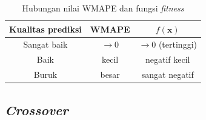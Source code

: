     \begin{table}[H]
    \centering
    \caption{Hubungan nilai WMAPE dan fungsi \textit{fitness}}
    \label{tab:fitness-wmape}
    \begin{tabular}{ccc}
    \hline
    \textbf{Kualitas prediksi} & \textbf{WMAPE} & \textbf{$f(\mathbf{x})$} \\
    \hline
    Sangat baik  & $\to 0$     & $\to 0$ (tertinggi) \\
    Baik         & kecil       & negatif kecil \\
    Buruk        & besar       & sangat negatif \\
    \hline
    \end{tabular}
    \end{table}

    \subsection{\textit{Crossover}}
    
